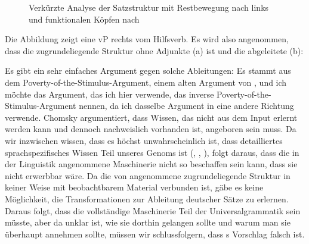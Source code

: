 \begin{figure}
\scalebox{.93}{%
\begin{forest}
sm edges
[CP
	[C$^0$[weil, tier=word]]
		[SubjP
			[DP$_i$ [der Mann,roof]]
				[ObjP
					[DP$_j$ [diese Sonate,roof]]
								[AuxP
									[VP$_k$ [gespielt,tier=word]]
									[Aux+
										[Aux [hat,tier=word]]
										[vP
											[DP$_i$ [,phantom]]
											[VP$_k$
												[V [,phantom]]
												[DP$_j$
                                                                                                  [,phantom]]]]]]]]]
\end{forest}%
}
\caption{\label{fig-Kayne-for-German}Verkürzte Analyse der Satzstruktur mit Restbewegung nach links
  und funktionalen Köpfen nach \citet[]{Laenzlinger2004a}}
\end{figure}%

Die Abbildung zeigt eine vP rechts vom Hilfsverb. Es wird also angenommen, dass die zugrundeliegende Struktur ohne Adjunkte
(a) ist und die abgeleitete (b):
\eal
{}
\zl

\noindent
Es gibt ein sehr einfaches Argument gegen solche Ableitungen: Es stammt aus dem Poverty-of-the-Stimulus-Argument,
einem alten Argument von \citet[]{Chomsky80b-u}, und ich möchte das Argument, das ich
hier verwende, das inverse Poverty-of-the-Stimulus-Argument\label{pos-argument} nennen, da ich dasselbe Argument in eine
andere Richtung verwende. Chomsky argumentiert, dass Wissen, das nicht aus dem
Input erlernt werden kann und dennoch nachweislich vorhanden ist, angeboren sein muss. Da wir inzwischen wissen, dass es
höchst unwahrscheinlich ist, dass detailliertes sprachspezifisches Wissen Teil unseres Genoms ist
(\citealt*{HCF2002a}, \cites{Bishop2002a}[Abschnitt~6.4.2.2]{Dabrowska2004a}, \citeauthor{FM2005a} \citeyear{FM2005a}), folgt daraus, dass
die in der Linguistik angenommene Maschinerie nicht so beschaffen sein kann, dass sie nicht erwerbbar wäre. Da die
von \citeauthor{Laenzlinger2004a} angenommene zugrundeliegende Struktur in keiner Weise mit beobachtbarem
Material verbunden ist, gäbe es keine Möglichkeit, die Transformationen zur Ableitung deutscher
Sätze zu erlernen. Daraus folgt, dass die vollständige Maschinerie Teil der Universalgrammatik sein müsste, aber
da unklar ist, wie sie dorthin gelangen sollte und warum man sie überhaupt annehmen sollte,
müssen wir schlussfolgern, dass \citeauthor{Kayne94a-u}s Vorschlag falsch ist.

